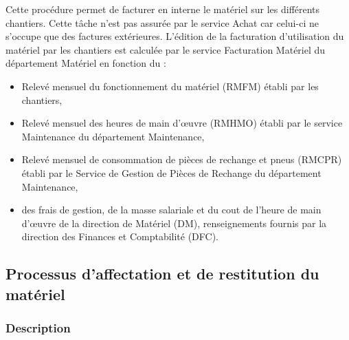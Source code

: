 				Cette procédure permet de facturer en interne le matériel sur les différents chantiers. Cette tâche n'est pas assurée par le service Achat car celui-ci ne s'occupe que des factures extérieures.
				\newline
				L'édition de la facturation d'utilisation du matériel par les chantiers est calculée par le service
Facturation Matériel du département Matériel en fonction du :
				\begin{itemize}
						    \item Relevé mensuel du fonctionnement du matériel (RMFM) établi par les chantiers,
						    \item Relevé mensuel des heures de main d'œuvre (RMHMO) établi par le service Maintenance
du département Maintenance,
						    \item Relevé mensuel de consommation de pièces de rechange et pneus (RMCPR) établi par le Service de Gestion de Pièces de Rechange du département Maintenance,
						    \item des frais de gestion, de la masse salariale et du cout de l'heure de main d'œuvre de la
direction de Matériel (DM), renseignements fournis par la direction des Finances et Comptabilité (DFC).
				\end{itemize}
				
				
				

		\subsection{Processus d'affectation et de restitution du matériel}
				\subsubsection{Description}
				
